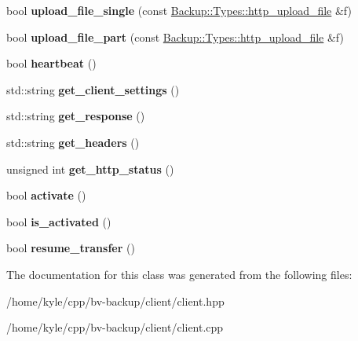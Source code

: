 \begin{DoxyCompactItemize}
\item 
\mbox{\label{class_backup_1_1_networking_1_1_client_a2d4d14d6aeee19c25a2ae0f8fbb3387f}} 
bool {\bfseries upload\+\_\+file\+\_\+single} (const \hyperlink{struct_backup_1_1_types_1_1http__upload__file}{Backup\+::\+Types\+::http\+\_\+upload\+\_\+file} \&f)
\item 
\mbox{\label{class_backup_1_1_networking_1_1_client_a253927293aef3a3e27c1f1c2fdb4aeb7}} 
bool {\bfseries upload\+\_\+file\+\_\+part} (const \hyperlink{struct_backup_1_1_types_1_1http__upload__file}{Backup\+::\+Types\+::http\+\_\+upload\+\_\+file} \&f)
\item 
\mbox{\label{class_backup_1_1_networking_1_1_client_aa013e81c21518b1bf73ef34a299a282c}} 
bool {\bfseries heartbeat} ()
\item 
\mbox{\label{class_backup_1_1_networking_1_1_client_a3c266c525f57ff238d641c19e9d9d9b6}} 
std\+::string {\bfseries get\+\_\+client\+\_\+settings} ()
\item 
\mbox{\label{class_backup_1_1_networking_1_1_client_ab89fd778cf90c0fe6082bd632c1aa521}} 
std\+::string {\bfseries get\+\_\+response} ()
\item 
\mbox{\label{class_backup_1_1_networking_1_1_client_a3d505c1dd66a343dffb5ab80f27bce6b}} 
std\+::string {\bfseries get\+\_\+headers} ()
\item 
\mbox{\label{class_backup_1_1_networking_1_1_client_a9180d4b04e4220fb348c324f1facc08d}} 
unsigned int {\bfseries get\+\_\+http\+\_\+status} ()
\item 
\mbox{\label{class_backup_1_1_networking_1_1_client_ac605aefd756b4d961552890d3b460711}} 
bool {\bfseries activate} ()
\item 
\mbox{\label{class_backup_1_1_networking_1_1_client_a3a322f210d20ff14c4f7b64ae1019bf0}} 
bool {\bfseries is\+\_\+activated} ()
\item 
\mbox{\label{class_backup_1_1_networking_1_1_client_acf76ef5dbe64c9b64b27fdc9275b3d4b}} 
bool {\bfseries resume\+\_\+transfer} ()
\end{DoxyCompactItemize}


The documentation for this class was generated from the following files\+:\begin{DoxyCompactItemize}
\item 
/home/kyle/cpp/bv-\/backup/client/client.\+hpp\item 
/home/kyle/cpp/bv-\/backup/client/client.\+cpp\end{DoxyCompactItemize}
